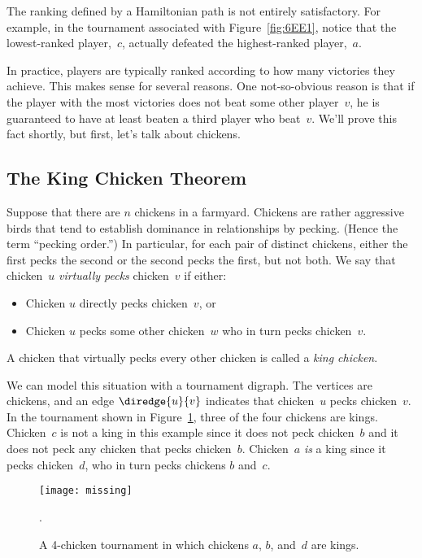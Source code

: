The ranking defined by a Hamiltonian path is not entirely
satisfactory.  For example, in the tournament associated with
Figure~\ref{fig:6EE1}, notice that the lowest-ranked player,~$c$,
actually defeated the highest-ranked player,~$a$.

In practice, players are typically ranked according to how many
victories they achieve.  This makes sense for several reasons.  One
not-so-obvious reason is that if the player with the most victories
does not beat some other player~$v$, he is guaranteed to have at least
beaten a third player who beat~$v$.  We'll prove this fact shortly,
but first, let's talk about chickens.

\subsection{The King Chicken Theorem}

Suppose that there are $n$ chickens in a farmyard.  Chickens are
rather aggressive birds that tend to establish dominance in
relationships by pecking.  (Hence the term ``pecking order.'')  In
particular, for each pair of distinct chickens, either the first pecks
the second or the second pecks the first, but not both.  We say that
chicken~$u$ \emph{virtually pecks} chicken~$v$ if either:
\begin{itemize}

\item Chicken $u$ directly pecks chicken~$v$, or

\item Chicken $u$ pecks some other chicken~$w$ who in turn pecks
  chicken~$v$.

\end{itemize}
A chicken that virtually pecks every other chicken is called a
\emph{king chicken}.

We can model this situation with a tournament digraph.  The vertices
are chickens, and an edge $\diredge{u}{v}$ indicates that chicken~$u$ pecks
chicken~$v$.  In the tournament shown in Figure~\ref{fig:6EE3}, three
of the four chickens are kings.  Chicken~$c$ is not a king in this
example since it does not peck chicken~$b$ and it does not peck any
chicken that pecks chicken~$b$.  Chicken~$a$ \emph{is} a king since it
pecks chicken~$d$, who in turn pecks chickens $b$ and~$c$.

\begin{figure}

\missinggraphic

\texttt{[image: missing]}

\caption{A 4-chicken tournament in which chickens $a$, $b$, and~$d$
  are kings.}

\label{fig:6EE3}.

\end{figure}

